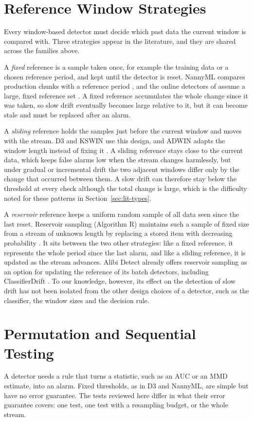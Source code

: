 \section{Reference Window Strategies}
\label{sec:lit-reference}
Every window-based detector must decide which past data the current window is compared with. Three strategies appear in the literature, and they are shared across the families above.

A \emph{fixed} reference is a sample taken once, for example the training data or a chosen reference period, and kept until the detector is reset. NannyML compares production chunks with a reference period \citep{NannyML}, and the online detectors of \citet{CobbSequential2022} assume a large, fixed reference set \citep{AlibiDetect}. A fixed reference accumulates the whole change since it was taken, so slow drift eventually becomes large relative to it, but it can become stale and must be replaced after an alarm.

A \emph{sliding} reference holds the samples just before the current window and moves with the stream. D3 \citep{Gozuacik2019} and KSWIN \citep{Raab2020} use this design, and ADWIN adapts the window length instead of fixing it \citep{BifetGavalda2007}. A sliding reference stays close to the current data, which keeps false alarms low when the stream changes harmlessly, but under gradual or incremental drift the two adjacent windows differ only by the change that occurred between them. A slow drift can therefore stay below the threshold at every check although the total change is large, which is the difficulty noted for these patterns in Section~\ref{sec:lit-types}.

A \emph{reservoir} reference keeps a uniform random sample of all data seen since the last reset. Reservoir sampling (Algorithm R) maintains such a sample of fixed size from a stream of unknown length by replacing a stored item with decreasing probability \citep{Vitter1985}. It sits between the two other strategies: like a fixed reference, it represents the whole period since the last alarm, and like a sliding reference, it is updated as the stream advances. Alibi Detect already offers reservoir sampling as an option for updating the reference of its batch detectors, including ClassifierDrift \citep{AlibiDetect}. To our knowledge, however, its effect on the detection of slow drift has not been isolated from the other design choices of a detector, such as the classifier, the window sizes and the decision rule.

\section{Permutation and Sequential Testing}
\label{sec:lit-testing}
A detector needs a rule that turns a statistic, such as an AUC or an MMD estimate, into an alarm. Fixed thresholds, as in D3 and NannyML, are simple but have no error guarantee. The tests reviewed here differ in what their error guarantee covers: one test, one test with a resampling budget, or the whole stream.

